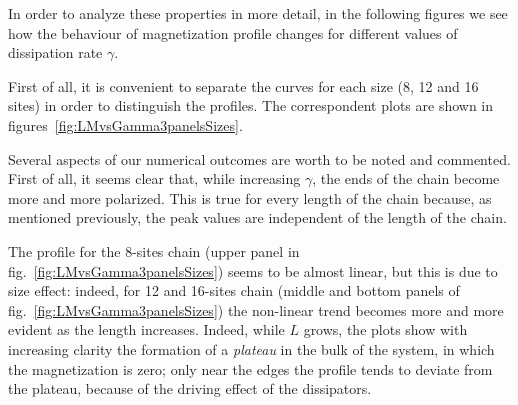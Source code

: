 In order to analyze these properties in more detail, in the following figures we see how the behaviour of magnetization profile changes for different values of dissipation rate $\gamma$. 

First of all, it is convenient to separate the curves for each size (8, 12 and 16 sites) in order to distinguish the profiles. The correspondent plots are shown in figures~\ref{fig:LMvsGamma3panelsSizes}.

Several aspects of our numerical outcomes are worth to be noted and commented. First of all, it seems clear that, while increasing $\gamma$, the ends of the chain become more and more polarized. This is true for every length of the chain because, as mentioned previously, the peak values are independent of the length of the chain.

The profile for the 8-sites chain (upper panel in fig.~\ref{fig:LMvsGamma3panelsSizes}) seems to be almost linear, but this is due to size effect: indeed, for 12 and 16-sites chain (middle and bottom panels of fig.~\ref{fig:LMvsGamma3panelsSizes}) the non-linear trend becomes more and more evident as the length increases. Indeed, while $L$ grows, the plots show with increasing clarity the formation of a \emph{plateau} in the bulk of the system, in which the magnetization is zero; only near the edges the profile tends to deviate from the plateau, because of the driving effect of the dissipators.

